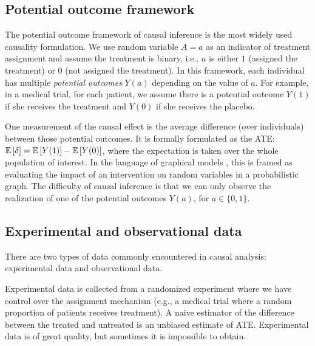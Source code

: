 \subsection{Potential outcome framework}\label{chpt:background:sec:potential}

The potential outcome framework of causal inference \citep{rubin1974ece} is the most widely used causality formulation. We use random variable $A = a$ as an indicator of treatment assignment and assume the treatment is binary, i.e., $a$ is either $1$ (assigned the treatment) or $0$ (not assigned the treatment). In this framework, each individual has multiple \textit{potential outcomes} $Y(a)$ depending on the value of $a$. For example, in a medical trial, for each patient, we assume there is a potential outcome $Y(1)$ if she receives the treatment and $Y(0)$ if she receives the placebo. 

One measurement of the causal effect is the average difference (over individuals) between those potential outcomes. It is formally formulated as the \gls{ATE}: $\mathbb{E}\left[\delta\right] = \mathbb{E}\left[Y(1)\right] - \mathbb{E}\left[Y(0)\right]$, where the expectation is taken over the whole population of interest. In the language of graphical models \citep{pearl2009causality},
this is framed as evaluating the impact of an intervention on random variables in a probabilistic graph. The difficulty of causal inference is that we can only observe the realization of one of the potential outcomes $Y(a)$, for $a\in\{0, 1\}$. 

\subsection{Experimental and observational data}


There are two types of data commonly encountered in causal analysis: experimental data and observational data. 

Experimental data is collected from a randomized experiment where we have control over the assignment mechanism (e.g., a medical trial where a random proportion of patients receives treatment). A naive estimator of the difference between the treated and untreated is an unbiased estimate of \gls{ATE}. Experimental data is of great quality, but sometimes it is impossible to obtain. 

